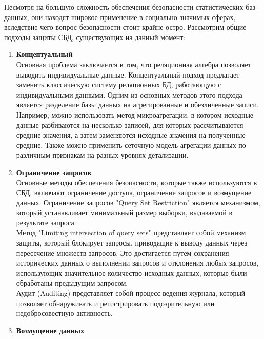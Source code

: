 Несмотря на большую сложность обеспечения безопасности статистических баз данных, они находят широкое применение в социально значимых сферах, вследствие чего вопрос безопасности стоит крайне остро. Рассмотрим общие подходы защиты СБД, существующих на данный момент: 

\begin{enumerate}
    \item \textbf{Концептуальный}
    \\

    Основная проблема заключается в том, что реляционная алгебра позволяет выводить индивидуальные данные. Концептуальный подход предлагает заменить классическую систему реляционных БД, работающую с индивидуальными данными. Одним из основных методов этого подхода является разделение базы данных на агрегированные и обезличенные записи. Например, можно использовать метод микроагрегации, в котором исходные данные разбиваются на несколько записей, для которых рассчитываются средние значения, а затем заменяются исходные значения на полученные средние. Также можно применить сеточную модель агрегации данных по различным признакам на разных уровнях детализации.

    \item \textbf{Ограничение запросов}
    \\

    Основные методы обеспечения безопасности, которые также используются в СБД, включают ограничение доступа, ограничение запросов и возмущение данных. Ограничение запросов "Query Set Restriction" является механизмом, который устанавливает минимальный размер выборки, выдаваемой в результате запроса.
    \\
    
	Метод "Limiting intersection of query sets" представляет собой механизм защиты, который блокирует запросы, приводящие к выводу данных через пересечение множеств запросов. Это достигается путем сохранения исторических данных о выполнении запросов и отклонения любых запросов, использующих значительное количество исходных данных, которые были обработаны предыдущим запросом.
    \\
    
	Аудит (Auditing) представляет собой процесс ведения журнала, который позволяет обнаруживать и регистрировать подозрительную или недобросовестную активность.

    \item \textbf{Возмущение данных}
    \\


\end{enumerate}
